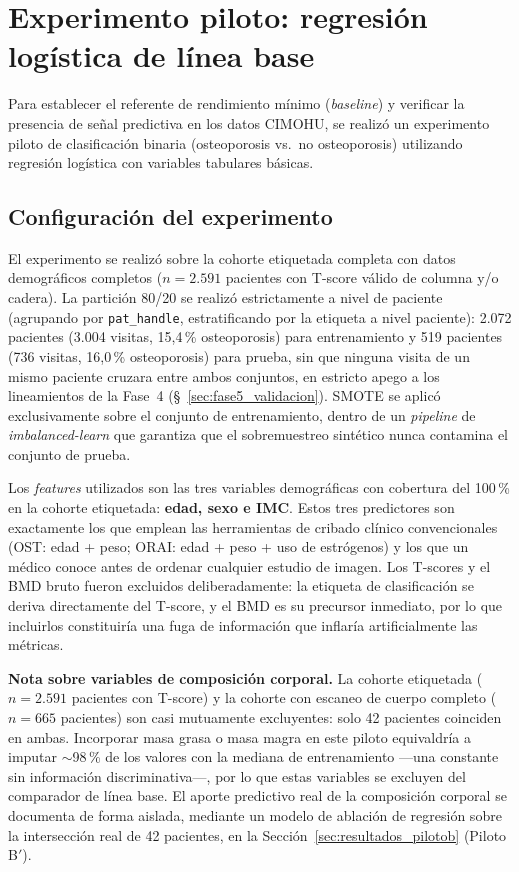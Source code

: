 \documentclass[../tesis.tex]{subfiles}
\begin{document}
\section{Experimento piloto: regresión logística de línea base}
\label{sec:resultados_piloto}

Para establecer el referente de rendimiento mínimo (\textit{baseline}) y verificar la presencia de señal predictiva en los datos CIMOHU, se realizó un experimento piloto de clasificación binaria (osteoporosis vs.\ no osteoporosis) utilizando regresión logística con variables tabulares básicas.

\subsection{Configuración del experimento}

El experimento se realizó sobre la cohorte etiquetada completa con datos demográficos completos ($n = 2.591$ pacientes con T-score válido de columna y/o cadera). La partición 80/20 se realizó estrictamente a nivel de paciente (agrupando por \texttt{pat\_handle}, estratificando por la etiqueta a nivel paciente): 2.072 pacientes (3.004 visitas, 15{,}4\,\% osteoporosis) para entrenamiento y 519 pacientes (736 visitas, 16{,}0\,\% osteoporosis) para prueba, sin que ninguna visita de un mismo paciente cruzara entre ambos conjuntos, en estricto apego a los lineamientos de la Fase~4 (§~\ref{sec:fase5_validacion}). SMOTE se aplicó exclusivamente sobre el conjunto de entrenamiento, dentro de un \textit{pipeline} de \textit{imbalanced-learn} que garantiza que el sobremuestreo sintético nunca contamina el conjunto de prueba.

Los \textit{features} utilizados son las tres variables demográficas con cobertura del 100\,\% en la cohorte etiquetada: \textbf{edad, sexo e IMC}. Estos tres predictores son exactamente los que emplean las herramientas de cribado clínico convencionales (OST: edad + peso; ORAI: edad + peso + uso de estrógenos) y los que un médico conoce antes de ordenar cualquier estudio de imagen. Los T-scores y el BMD bruto fueron excluidos deliberadamente: la etiqueta de clasificación se deriva directamente del T-score, y el BMD es su precursor inmediato, por lo que incluirlos constituiría una fuga de información que inflaría artificialmente las métricas.

\textbf{Nota sobre variables de composición corporal.} La cohorte etiquetada ($n = 2.591$ pacientes con T-score) y la cohorte con escaneo de cuerpo completo ($n = 665$ pacientes) son casi mutuamente excluyentes: solo 42 pacientes coinciden en ambas. Incorporar masa grasa o masa magra en este piloto equivaldría a imputar $\sim$98\,\% de los valores con la mediana de entrenamiento ---una constante sin información discriminativa---, por lo que estas variables se excluyen del comparador de línea base. El aporte predictivo real de la composición corporal se documenta de forma aislada, mediante un modelo de ablación de regresión sobre la intersección real de 42 pacientes, en la Sección~\ref{sec:resultados_pilotob} (Piloto B$'$).
\end{document}
